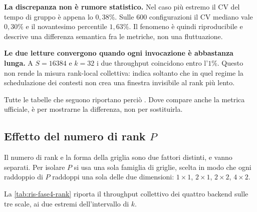 \textbf{La discrepanza non è rumore statistico.} Nel caso più estremo il CV del
tempo di gruppo è appena lo $0{,}38\%$. Sulle 600 configurazioni il CV mediano
vale $0{,}30\%$ e il novantesimo percentile $1{,}63\%$. Il fenomeno è quindi
riproducibile e descrive una differenza semantica fra le metriche, non una
fluttuazione.

\textbf{Le due letture convergono quando ogni invocazione è abbastanza lunga.} A
$S=16384$ e $k=32$ i due throughput coincidono entro l'$1\%$. Questo non rende
la misura rank-local collettiva: indica soltanto che in quel regime la
schedulazione dei contesti non crea una finestra invisibile al rank più lento.

\medskip

Tutte le tabelle che seguono riportano perciò . Dove
compare anche la metrica ufficiale, è per mostrarne la differenza, non per
sostituirla.

\subsection{Effetto del numero di rank $P$}
\label{sec:ris-fase4-rank}

Il numero di rank e la forma della griglia sono due fattori distinti, e vanno
separati. Per isolare $P$ si usa una sola famiglia di griglie, scelta in modo
che ogni raddoppio di $P$ raddoppi una sola delle due dimensioni:
$1\times1$, $2\times1$, $2\times2$, $4\times2$.

La \cref{tab:ris-fase4-rank} riporta il throughput collettivo dei quattro
backend sulle tre scale, ai due estremi dell'intervallo di $k$.

